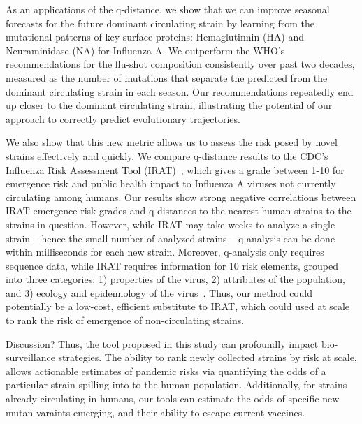 \documentclass[onecolumn, compsoc,10pt]{IEEEtran}
\begin{document}
As an applications of the q-distance, we show that we can improve seasonal forecasts for the future dominant circulating strain by learning from the mutational patterns of key surface proteins: Hemaglutinnin (HA) and Neuraminidase (NA) for Influenza A. We outperform the WHO's recommendations for the flu-shot composition consistently over past two decades, measured as the number of mutations that separate the predicted from the dominant circulating strain in each season. Our recommendations repeatedly end up closer to the dominant circulating strain, illustrating the potential of our approach to correctly predict evolutionary trajectories. 

We also show that this new metric allows us to  assess the risk posed by novel strains  effectively and quickly. We compare q-distance results to the CDC's Influenza Risk Assessment Tool (IRAT)~\cite{Influenz24:online}, which gives a grade between 1-10 for emergence risk and public health impact to Influenza A viruses not currently circulating among humans. Our results show strong negative correlations between IRAT emergence risk grades and q-distances to the nearest human strains to the strains in question. However, while IRAT may take weeks to analyze a single strain -- hence the small number of analyzed strains -- q-analysis can be done within milliseconds for each new strain. Moreover, q-analysis only requires sequence data, while IRAT requires information for 10 risk elements, grouped into three categories: 1) properties of the virus, 2) attributes of the population, and 3) ecology and epidemiology of the virus~\cite{Influenz24:online}. Thus, our method could potentially be a low-cost, efficient substitute to IRAT, which could used at scale to rank the risk of emergence of non-circulating strains.

{\color{Red1} Discussion? 
Thus, the tool proposed in this study  can  profoundly impact  bio-surveillance strategies. The ability to rank newly collected strains by risk at scale, allows actionable estimates of  pandemic risks via  quantifying the odds of a particular strain spilling into to the human population. Additionally,  for strains already circulating in humans, our tools can estimate the odds  of specific  new mutan varaints emerging, and their ability to  escape current vaccines. %
}
\end{document}

